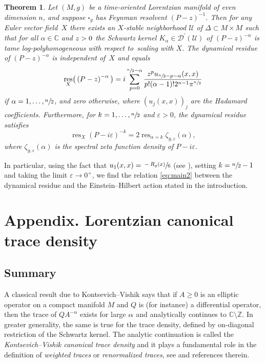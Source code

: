 \documentclass[JEP,XML,SOM,Unicode]{cedram}
\let\pazocal\mathscr
\newtheorem{theorem}{Theorem}[section]
\theoremstyle{definition}
\newcommand\zz{{\mathbb Z}}
\newcommand\cc{{\mathbb C}}
\let\cv\alpha
\let\euler X
\let\Im\relax
\let\Re\relax
\DeclareMathOperator{\Im}{Im}
\DeclareMathOperator{\Re}{Re}
\DeclareMathOperator{\resnorm}{res}
\DeclareMathOperator*{\res}{res}
\newcommand{\resdyn}{{\resnorm_\euler}}
\def\sn2{\sfrac{n}{2}}
\begin{document}
\begin{theorem}\label{thm:dynres1} Let $(M,g)$ be a time-oriented Lorentzian manifold of even dimension $n$, and suppose $\square_g$ has Feynman resolvent $(P-z)^{-1}$. Then for any Euler vector field~$\euler$ there exists an $\euler$-stable neighborhood $\pazocal{U}$ of $\Delta\subset M\times M$ such that for all $\cv\in\cc$ and $\Im z > 0$ the Schwartz kernel $K_\cv\in \pazocal{D}^\prime(\pazocal{U})$ of $(P-z)^{-\cv}$
is tame log-polyhomogeneous with respect to~scaling with $\euler$.
The dynamical residue of $(P-z)^{-\cv}$ is independent of~$\euler$ and equals
\begin{equation}\label{eq:explicit}
\resdyn\big(\left(P-z\right)^{-\cv} \big)= i\sum_{p=0}^{\sfrac{n}{2}-\cv}
\frac{z^pu_{\sfrac{n}{2}-p-\cv}(x,x)}{p!(\cv-1)!2^{n-1}\pi^{\sfrac{n}{2}}}
\end{equation}
if $\alpha = 1,\dots, \sn2$, and zero otherwise, where $(u_j(x,x))_j$ are the Hadamard coefficients. Furthermore, for $k=1,\dots,\sfrac{n}{2}$ and $\varepsilon>0$, the dynamical residue satisfies
\begin{equation*}%
\resdyn \left(P-i \varepsilon \right)^{-k} = 2 \res_{\cv =k}\zeta_{g,\varepsilon}(\cv),
\end{equation*}
where $\zeta_{g,\varepsilon}(\cv)$ is the spectral zeta function density of $P-i \varepsilon$.
\end{theorem}

In particular, using the fact that $u_1(x,x)=\sfrac{-R_g(x)}{6}$ (see \eg \cite[\S8.6]{Dang2020}), setting $k=\sfrac{n}{2}-1$ and taking the limit $\varepsilon\to 0^+$, we find the relation \eqref{eq:main2} between the dynamical residue and the Einstein--Hilbert action stated in the introduction.

\appendix
\section*{Appendix. Lorentzian canonical trace density}
\label{app}

\subsection{Summary} A classical result due to Kontsevich--Vishik \cite{Kontsevich1995} says that if $A\geqslant 0$ is an elliptic operator on a compact manifold $M$ and $Q$ is (for instance) a differential operator, then the trace of $Q A^{-\cv}$ exists for large $\Re \cv$ and analytically continues to $\cc\setminus \zz$. In greater generality, the same is true for the trace density, defined by on-diagonal restriction of the Schwartz kernel. The analytic continuation is called the \emph{Kontsevich--Vishik canonical trace density} and it plays a fundamental role in the definition of \emph{weighted traces} or \emph{renormalized traces}, see \eg \cite{paycha} and references therein.
\end{document}
